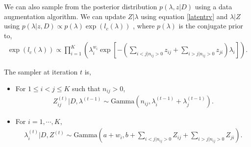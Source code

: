 \documentclass[11pt]{article}
\numberwithin{equation}{section}
\begin{document}
We can also sample from the posterior distribution $p(\lambda, z|D)$ using a data augmentation algorithm. We can update $Z|\lambda$ using equation \ref{latentrv} and $\lambda|Z$  using $p(\lambda|z,D) \propto p(\lambda)\exp (l_c(\lambda))$ , where $p(\lambda)$ is the conjugate prior to, 
\begin{align}
\exp (l_c(\lambda)) \propto \prod _{i=1}^K \left( \lambda_i^{w_i} \exp \left[ -\left(\sum_{i<j|n_{ij} >0} z_{ij} + \sum_{i>j|n_{ij} >0}z_{ji}\right)\lambda_i \right] \right).
\end{align}

The sampler at iteration $t$ is, 
\begin{itemize}
\item For $1 \leq i<j \leq K$ such that $n_{ij} >0$, 
\begin{align}
Z_{ij}^{(t)} |D,\lambda^{(t-1)} \sim \mathrm{Gamma} (n_{ij}, \lambda_i^{(t-1)} + \lambda_{j}^{(t-1)}).
\end{align}
\item For $i = 1, \cdots, K$, 
\begin{align}
\lambda_i^{(t)} | D,Z^{(t)} \sim \mathrm{Gamma} \left( a + w_i, b + \sum_{i<j|n_{ij} >0} Z_{ij} + \sum_{i>j|n_{ij} >0}Z_{ji} \right).
\end{align}
\end{itemize}
\end{document}
